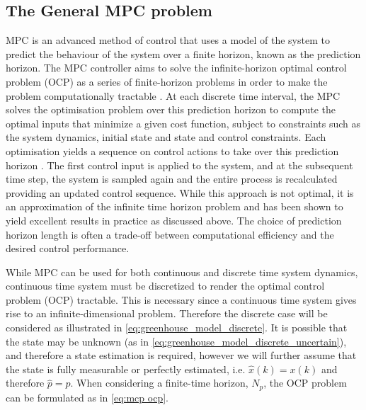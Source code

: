 \subsection {The General MPC problem}
MPC is an advanced method of control that uses a model of the system to predict the behaviour of the system over a finite horizon, known as the prediction horizon. The MPC controller  aims to solve the infinite-horizon optimal control problem (OCP) as a series of finite-horizon problems in order to make the problem computationally tractable \cite{beckenbachAddressingInfinitehorizonOptimization2018}. At each discrete time interval, the MPC solves the optimisation problem over this prediction horizon to compute the optimal inputs that minimize a given cost function, subject to constraints such as the system dynamics, initial state and state and control constraints. Each optimisation yields a sequence on control actions to take over this prediction horizon . The first control input is applied to the system, and at the subsequent time step, the system is sampled again and the entire process is recalculated providing an updated control sequence. While this approach is not optimal, it is an approximation of the infinite time horizon problem and has been shown to yield excellent results in practice as discussed above. The choice of prediction horizon length is often a trade-off between computational efficiency and the desired control performance. 

While MPC can be used for both continuous and discrete time system dynamics,  continuous time system must be discretized to render the optimal control problem (OCP) tractable. This is necessary since a continuous time system gives rise to an infinite-dimensional problem. Therefore the discrete case will be considered as illustrated in \autoref{eq:greenhouse_model_discrete}.
It is possible that the state may be unknown (as in \autoref{eq:greenhouse_model_discrete_uncertain}), and therefore a state estimation is required, however we will further assume that the state is fully measurable or perfectly estimated, i.e. $\hat x(k) = x(k)$ and therefore $\hat{p} = p$. When considering a finite-time horizon, $N_p$, the OCP problem can be formulated as in \autoref{eq:mcp ocp}.

